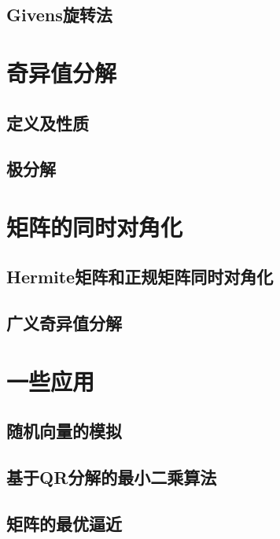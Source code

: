 \subsection{Givens旋转法}
\label{sub:Givens旋转法}

\section{奇异值分解}
\label{sec:奇异值分解}

\subsection{定义及性质}
\label{sub:定义及性质}

\subsection{极分解}
\label{sub:极分解}

\section{矩阵的同时对角化}
\label{sec:矩阵的同时对角化}

\subsection{Hermite矩阵和正规矩阵同时对角化}
\label{sub:Hermite矩阵和正规矩阵同时对角化}

\subsection{广义奇异值分解}
\label{sub:广义奇异值分解}

\section{一些应用}
\label{sec:一些应用}

\subsection{随机向量的模拟}
\label{sub:随机向量的模拟}

\subsection{基于QR分解的最小二乘算法}
\label{sub:基于QR分解的最小二乘算法}

\subsection{矩阵的最优逼近}
\label{sub:矩阵的最优逼近}


